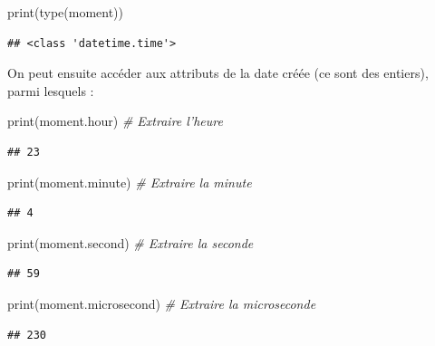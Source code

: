 \documentclass[12pt,]{book}
\newenvironment{Shaded}{\begin{snugshade}}{\end{snugshade}}
\newcommand{\CommentTok}[1]{\textcolor[rgb]{0.56,0.35,0.01}{\textit{#1}}}
\newcommand{\BuiltInTok}[1]{#1}
\newcommand{\NormalTok}[1]{#1}
\numberwithin{equation}{section}
\numberwithin{countremarque}{section}
\begin{document}
\begin{Shaded}
\begin{Highlighting}[]
\BuiltInTok{print}\NormalTok{(}\BuiltInTok{type}\NormalTok{(moment))}
\end{Highlighting}
\end{Shaded}

\begin{lstlisting}
## <class 'datetime.time'>
\end{lstlisting}

On peut ensuite accéder aux attributs de la date créée (ce sont des
entiers), parmi lesquels :

\begin{Shaded}
\begin{Highlighting}[]
\BuiltInTok{print}\NormalTok{(moment.hour) }\CommentTok{# Extraire l'heure}
\end{Highlighting}
\end{Shaded}

\begin{lstlisting}
## 23
\end{lstlisting}

\begin{Shaded}
\begin{Highlighting}[]
\BuiltInTok{print}\NormalTok{(moment.minute) }\CommentTok{# Extraire la minute}
\end{Highlighting}
\end{Shaded}

\begin{lstlisting}
## 4
\end{lstlisting}

\begin{Shaded}
\begin{Highlighting}[]
\BuiltInTok{print}\NormalTok{(moment.second) }\CommentTok{# Extraire la seconde}
\end{Highlighting}
\end{Shaded}

\begin{lstlisting}
## 59
\end{lstlisting}

\begin{Shaded}
\begin{Highlighting}[]
\BuiltInTok{print}\NormalTok{(moment.microsecond) }\CommentTok{# Extraire la microseconde}
\end{Highlighting}
\end{Shaded}

\begin{lstlisting}
## 230
\end{lstlisting}
\end{document}
